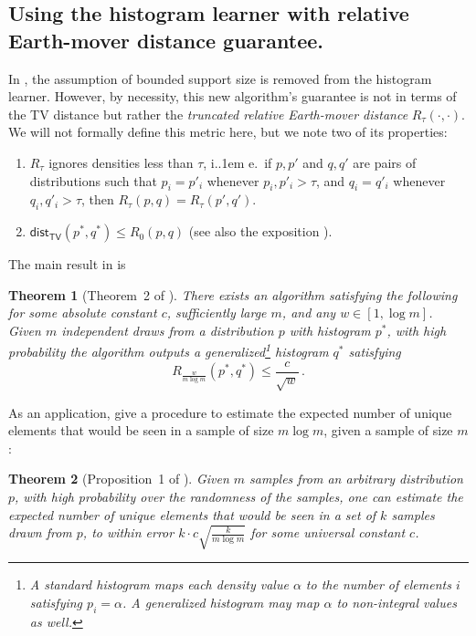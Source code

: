 \documentclass[10pt,a4paper]{article}
\newtheorem{theorem}{Theorem}[section]
\newcommand*\ie{i.\kern.1em e.\ }
\newcommand{\dist}{\mathsf{dist}}
\newcommand{\TV}{\mathsf{TV}}
\begin{document}
\subsection{Using the histogram learner with relative Earth-mover distance guarantee.}
In \cite{VV16}, the assumption of bounded support size is removed from the histogram learner.
However, by necessity, this new algorithm's guarantee is not in terms of the TV distance but rather
the \emph{truncated relative Earth-mover distance} $R_\tau(\cdot, \cdot)$. We will not formally
define this metric here, but we note two of its properties:
\begin{enumerate}
\item $R_\tau$ ignores densities less than $\tau$, \ie if $p, p'$ and  $q, q'$ are pairs of distributions
such that $p_i = p'_i$ whenever $p_i, p'_i > \tau$, and $q_i = q'_i$ whenever $q_i, q'_i > \tau$,
then $R_\tau(p,q) = R_\tau(p',q')$.
\item $\dist_\TV(p^*,q^*) \leq R_0(p,q)$ (see also the exposition \cite{GR20}).
\end{enumerate}
The main result in \cite{VV16} is

\begin{theorem}[Theorem~2 of {\cite{VV16}}]
    \label{res:vv16-main}
    There exists an algorithm satisfying the following for some absolute constant $c$, sufficiently
    large $m$, and any $w \in [1, \log m]$. Given $m$ independent draws from a distribution $p$ with
    histogram $p^*$, with high probability the algorithm outputs a generalized\footnote{A standard
        histogram maps each density value $\alpha$ to the number of elements $i$ satisfying $p_i =
    \alpha$. A generalized histogram may map $\alpha$ to non-integral values as well.} histogram
    $q^*$ satisfying
    \[
        R_{\frac{w}{m \log m}}(p^*, q^*) \le \frac{c}{\sqrt{w}} \,.
    \]
\end{theorem}

As an application, \cite{VV16} give a procedure to estimate the expected number of unique elements
that would be seen in a sample of size $m \log m$, given a sample of size $m$:

\begin{theorem}[Proposition~1 of {\cite{VV16}}]
    \label{res:vv16-unique}
    Given $m$ samples from an arbitrary distribution $p$, with high probability over the randomness
    of the samples, one can estimate the expected number of unique elements that would be seen in a
    set of $k$ samples drawn from $p$, to within error $k \cdot c \sqrt{\frac{k}{m \log m}}$ for
    some universal constant $c$.
\end{theorem}
\end{document}
